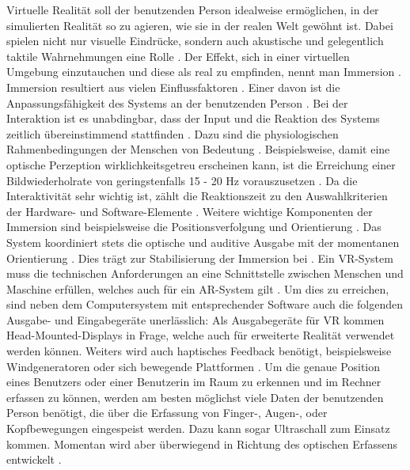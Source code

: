 \documentclass[deutsch]{llncs}
\begin{document}
Virtuelle Realität soll der benutzenden Person idealweise ermöglichen, in der simulierten Realität so zu agieren, wie sie in der realen Welt gewöhnt ist\cite{vr}. Dabei spielen nicht nur visuelle Eindrücke, sondern auch akustische und gelegentlich taktile Wahrnehmungen eine Rolle \cite{vr}. Der Effekt, sich in einer virtuellen Umgebung einzutauchen und diese als real zu empfinden, nennt man Immersion \cite{vr}. Immersion resultiert aus vielen Einflussfaktoren \cite{vr}. Einer davon ist die Anpassungsfähigkeit des Systems an der benutzenden Person \cite{vr}. Bei der Interaktion ist es unabdingbar, dass der Input und die Reaktion des Systems zeitlich übereinstimmend stattfinden \cite{vr}. Dazu sind die physiologischen Rahmenbedingungen der Menschen von Bedeutung \cite{vr}. Beispielsweise, damit eine optische Perzeption wirklichkeitsgetreu erscheinen kann, ist die Erreichung einer Bildwiederholrate von geringstenfalls 15 - 20 Hz vorauszusetzen \cite{vr}. Da die Interaktivität sehr wichtig ist, zählt die Reaktionszeit zu den Auswahlkriterien der Hardware- und Software-Elemente \cite{vr}. Weitere wichtige Komponenten der Immersion sind beispielsweise die Positionsverfolgung und Orientierung \cite{vr}. Das System koordiniert stets die optische und auditive Ausgabe mit der momentanen Orientierung \cite{vr}. Dies trägt zur Stabilisierung der Immersion bei \cite{vr}.
Ein VR-System muss die technischen Anforderungen an eine Schnittstelle zwischen Menschen und Maschine erfüllen, welches auch für ein AR-System gilt \cite{Klampfer}. Um dies zu erreichen, sind neben dem Computersystem mit entsprechender Software auch die folgenden Ausgabe- und Eingabegeräte unerlässlich: 
Als Ausgabegeräte für VR kommen Head-Mounted-Displays in Frage, welche auch für erweiterte Realität verwendet werden können. Weiters wird auch haptisches Feedback benötigt, beispielsweise Windgeneratoren oder sich bewegende Plattformen \cite{Klampfer}. 
Um die genaue Position eines Benutzers oder einer Benutzerin im Raum zu erkennen und im Rechner erfassen zu können, werden am besten möglichst viele Daten der benutzenden Person benötigt, die über die Erfassung von Finger-, Augen-, oder Kopfbewegungen eingespeist werden\cite{Klampfer}. Dazu kann sogar Ultraschall zum Einsatz kommen\cite{Klampfer}. Momentan wird aber überwiegend in Richtung des optischen Erfassens entwickelt \cite{Klampfer}.\\
\end{document}
